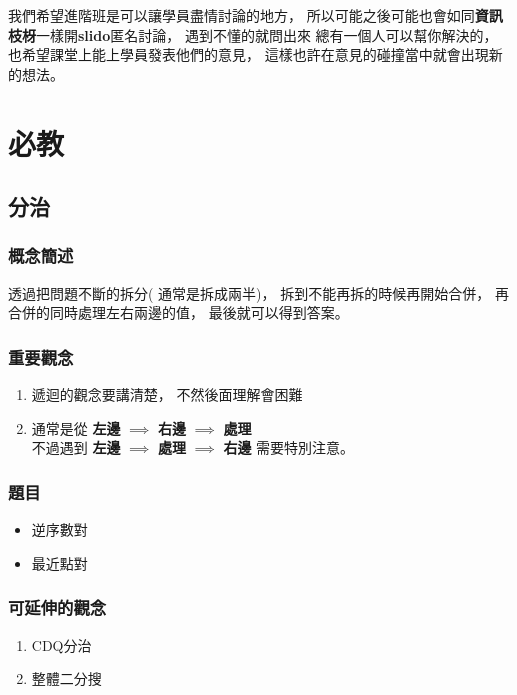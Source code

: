 \documentclass[12pt,oneside]{article}
\begin{document}
我們希望進階班是可以讓學員盡情討論的地方，
所以可能之後可能也會如同\textbf{資訊枝枒}一樣開\textbf{slido}匿名討論，
遇到不懂的就問出來
總有一個人可以幫你解決的，
也希望課堂上能上學員發表他們的意見，
這樣也許在意見的碰撞當中就會出現新的想法。





\clearpage
\section{必教}

\subsection{分治}
\subsubsection*{概念簡述}
透過把問題不斷的拆分( 通常是拆成兩半)，
拆到不能再拆的時候再開始合併，
再合併的同時處理左右兩邊的值，
最後就可以得到答案。

\subsubsection*{重要觀念}
\begin{adjustwidth}{2em}{0em}
\begin{enumerate}
    \item 
        遞迴的觀念要講清楚，
        不然後面理解會困難
    \item 
        通常是從 \textbf{左邊} $\implies$ \textbf{右邊} $\implies$ \textbf{處理} \\
        不過遇到 \textbf{左邊} $\implies$ \textbf{處理} $\implies$ \textbf{右邊} 需要特別注意。

\end{enumerate}
\end{adjustwidth}

\subsubsection*{題目}
\begin{adjustwidth}{2em}{0em}
\begin{itemize}
    \item 逆序數對
    \item 最近點對
\end{itemize}
\end{adjustwidth}

\subsubsection*{可延伸的觀念}
\begin{adjustwidth}{2em}{0em}
\begin{enumerate}
    \item CDQ分治
    \item 整體二分搜
\end{enumerate}
\end{adjustwidth}
\end{document}
